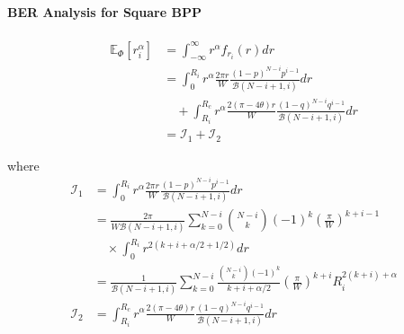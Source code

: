 \documentclass[slidestop,usepdftitle=false]{gvvslides}
\providecommand{\sbrak}[1]{\ensuremath{{}\left[#1\right]}}
\providecommand{\brak}[1]{\ensuremath{\left(#1\right)}}
\begin{document}
\begin{frame}
\frametitle{\,}
\framesubtitle{BER Analysis for Square BPP}
  \begin{align}
   \mathbb{E}_{\Phi}\sbrak{r_i^{\alpha}} & =\int_{-\infty}^{\infty}r^{\alpha}f_{r_i}(r)dr \nonumber \\
   & = \int_{0}^{R_i}r^{\alpha}\frac{2\pi r}{W}\frac{\brak{1-p}^{N-i}p^{i-1}}{\mathcal{B}\brak{N-i+1,
   i}}dr \nonumber \\
   &\quad  +\int_{R_i}^{R_c}r^{\alpha}\frac{2\brak{\pi-4\theta} r}{W}\frac{\brak{1-q}^{N-i}q^{i-1}}{\mathcal{B}\brak{N-i+1,i}}dr \nonumber
   \\
    & =   \mathcal{I}_1 + \mathcal{I}_2 \nonumber
   \end{align}
   \end{frame}
   \begin{frame}
   where
   \begin{align}
    \mathcal{I}_1& = \int_{0}^{R_i}r^{\alpha}\frac{2\pi r}{W}\frac{\brak{1-p}^{N-i}p^{i-1}}{\mathcal{B}\brak{N-i+1,i}}dr \nonumber \\
   & = \frac{2\pi }{W\mathcal{B}\brak{N-i+1,i}}\sum_{k=0}^{N-i}\binom{N-i}{k}(-1)^k\brak{\frac{\pi}{W}}^{k+i-1}
  \nonumber \\
  &\quad \times\int_{0}^{R_i}r^{2\brak{k+i+\alpha/2+1/2}} dr \nonumber
     \\
       & = \frac{1 }{\mathcal{B}\brak{N-i+1,i}}\sum_{k=0}^{N-i}\frac{\binom{N-i}{k}(-1)^k}{k+i+\alpha/2}\brak{\frac{\pi}{W}}^{k+i}R_i^{2\brak{k+i}+\alpha}
       \\
    \mathcal{I}_2 & = \int_{R_i}^{R_c}r^{\alpha}\frac{2\brak{\pi-4\theta} r}{W}\frac{\brak{1-q}^{N-i}q^{i-1}}{\mathcal{B}\brak{N-i+1,i}}dr \nonumber \\

\end{align}
\end{frame}
\end{document}
